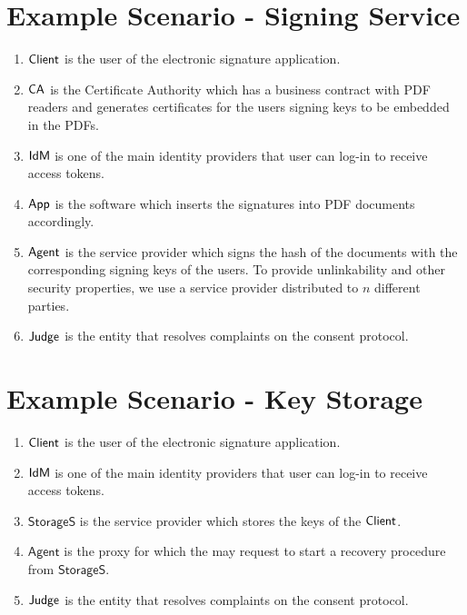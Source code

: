\section{Example Scenario - Signing Service}

\begin{enumerate}
    \item $\textsf{Client}$ is the user of the electronic signature application.
    \item $\textsf{CA}$ is the Certificate Authority which has a business contract with PDF readers and generates certificates for the users signing keys to be embedded in the PDFs.
    \item $\textsf{IdM}$ is one of the main identity providers that user can log-in to receive access tokens.
    \item $\textsf{App}$ is the software which inserts the signatures into PDF documents accordingly.
    \item $\textsf{Agent}$ is the service provider which signs the hash of the documents with the corresponding signing keys of the users. To provide unlinkability and other security properties, we use a service provider distributed to $n$ different parties.
    \item $\textsf{Judge}$ is the entity that resolves complaints on the consent protocol.
\end{enumerate}

\section{Example Scenario - Key Storage}

\begin{enumerate}
    \item $\textsf{Client}$ is the user of the electronic signature application.
    \item $\textsf{IdM}$ is one of the main identity providers that user can log-in to receive access tokens.
    \item $\mathsf{StorageS}$ is the service provider which stores the keys of the $\textsf{Client}$.
    \item $\mathsf{Agent}$ is the proxy for which the \client may request to start a recovery procedure from $\mathsf{StorageS}$.
    \item $\textsf{Judge}$ is the entity that resolves complaints on the consent protocol.
\end{enumerate}